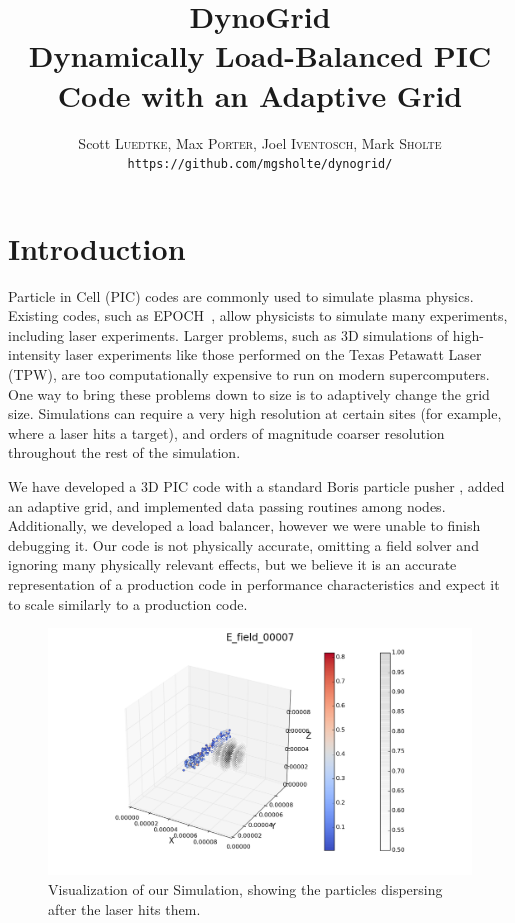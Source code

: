 \documentclass[]{article}
\begin{document}
\title{DynoGrid\\{\Large Dynamically Load-Balanced PIC Code with an Adaptive Grid}}

\author{Scott \textsc{Luedtke}, Max \textsc{Porter}, Joel \textsc{Iventosch}, Mark \textsc{Sholte}\\\texttt{https://github.com/mgsholte/dynogrid/}}

\maketitle

\section{Introduction}

Particle in Cell (PIC) codes are commonly used to simulate plasma physics.  Existing codes, such as EPOCH~\cite{epoch}, allow physicists to simulate many experiments, including laser experiments.  Larger problems, such as 3D simulations of high-intensity laser experiments like those performed on the Texas Petawatt Laser (TPW), are too computationally expensive to run on modern supercomputers.  One way to bring these problems down to size is to adaptively change the grid size.  Simulations can require a very high resolution at certain sites (for example, where a laser hits a target), and orders of magnitude coarser resolution throughout the rest of the simulation.

We have developed a 3D PIC code with a standard Boris particle pusher \cite{bird}, added an adaptive grid, and implemented data passing routines among nodes.  Additionally, we developed a load balancer, however we were unable to finish debugging it.  Our code is not physically accurate, omitting a field solver and ignoring many physically relevant effects, but we believe it is an accurate representation of a production code in performance characteristics and expect it to scale similarly to a production code.

\begin{figure}[h!]
    \centering
    \includegraphics[width=15cm]{viz_1.png}
    \caption{Visualization of our Simulation, showing the particles dispersing after the laser hits them.}
\end{figure}
\end{document}
